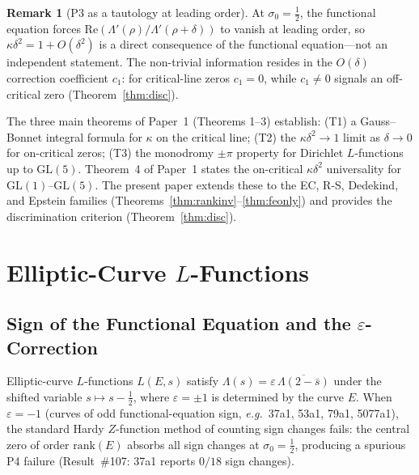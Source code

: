 \documentclass[11pt, a4paper]{article}
\theoremstyle{plain}
\theoremstyle{definition}
\newtheorem{remark}{Remark}[section]
\newcommand{\eg}{\textit{e.g.}}
\begin{document}
\begin{remark}[P3 as a tautology at leading order]
\label{rem:tautology}
  At $\sigma_{0}=\tfrac{1}{2}$, the functional equation forces
  $\mathrm{Re}(\Lambda'(\rho)/\Lambda'(\rho+\delta))$ to vanish at
  leading order, so $\kappa\delta^{2}=1+O(\delta^{2})$ is a direct
  consequence of the functional equation---not an independent
  statement.  The non-trivial information resides in the $O(\delta)$
  correction coefficient $c_{1}$: for critical-line zeros $c_{1}=0$,
  while $c_{1}\neq 0$ signals an off-critical zero (Theorem~\ref{thm:disc}).
\end{remark}

The three main theorems of Paper~1 (Theorems 1--3) establish:
(T1) a Gauss--Bonnet integral formula for $\kappa$ on the critical line;
(T2) the $\kappa\delta^{2}\to 1$ limit as $\delta\to 0$ for on-critical
zeros; (T3) the monodromy $\pm\pi$ property for Dirichlet $L$-functions
up to $\mathrm{GL}(5)$.  Theorem~4 of Paper~1 states the on-critical
$\kappa\delta^{2}$ universality for $\mathrm{GL}(1)$--$\mathrm{GL}(5)$.
The present paper extends these to the EC, R-S, Dedekind, and Epstein
families (Theorems~\ref{thm:rankinv}--\ref{thm:feonly}) and provides the discrimination criterion
(Theorem~\ref{thm:disc}).


\section{Elliptic-Curve $L$-Functions}
\label{sec:ec}

\subsection{Sign of the Functional Equation and the $\varepsilon$-Correction}
\label{ssec:epsilon}

Elliptic-curve $L$-functions $L(E,s)$ satisfy $\Lambda(s) = \varepsilon\,
\overline{\Lambda(2-\bar{s})}$ under the shifted variable $s\mapsto s-\tfrac{1}{2}$,
where $\varepsilon=\pm 1$ is determined by the curve $E$.
When $\varepsilon=-1$ (curves of odd functional-equation sign, \eg\
37a1, 53a1, 79a1, 5077a1), the standard Hardy $Z$-function method of
counting sign changes fails: the central zero of order $\text{rank}(E)$
absorbs all sign changes at $\sigma_{0}=\tfrac{1}{2}$, producing a
spurious P4 failure (Result~\#107: 37a1 reports $0/18$ sign changes).
\end{document}
